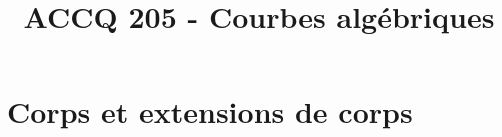 \documentclass[a4paper,9pt]{article}
\title{\vspace{-1.2cm} ACCQ 205 - Courbes algébriques}
\begin{document}
\maketitle

\vspace{-1.5cm}

\section{Corps et extensions de corps}
	
\end{document}
